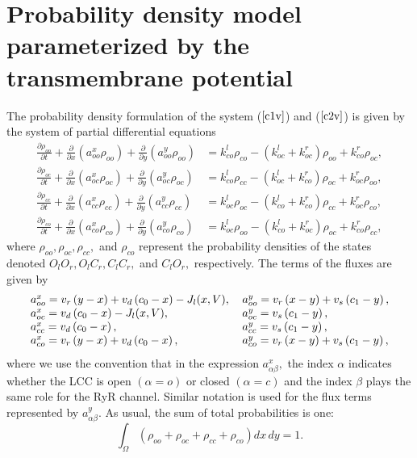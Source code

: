 \section[Probability density model parameterized by V]{Probability density model parameterized by the transmembrane potential}


The probability density formulation of the system ($\ref{c1v}$) and ($\ref{c2v}$) is given by the
 system of partial differential equations
\begin{align}
\frac{\partial\rho_{oo}}{\partial t}+\frac{\partial}{\partial x}\left(
a_{oo}^{x}\rho_{oo}\right)  +\frac{\partial}{\partial y}\left(  a_{oo}^{y}
\rho_{oo}\right)   &  =k_{co}^{l}\rho_{co}-\left(  k_{oc}^{l}+k_{oc}
^{r}\right)  \rho_{oo}+k_{co}^{r}\rho_{oc},\label{eq:pdfoo}\\
\frac{\partial\rho_{oc}}{\partial t}+\frac{\partial}{\partial x}\left(
a_{oc}^{x}\rho_{oc}\right)  +\frac{\partial}{\partial y}\left(  a_{oc}^{y}
\rho_{oc}\right)   &  =k_{co}^{l}\rho_{cc}-\left(  k_{oc}^{l}+k_{co}
^{r}\right)  \rho_{oc}+k_{oc}^{r}\rho_{oo},\label{eq:pdfoc}\\
\frac{\partial\rho_{cc}}{\partial t}+\frac{\partial}{\partial x}\left(
a_{cc}^{x}\rho_{cc}\right)  +\frac{\partial}{\partial y}\left(  a_{cc}^{y}
\rho_{cc}\right)   &  =k_{oc}^{l}\rho_{oc}-\left(  k_{co}^{l}+k_{co}
^{r}\right)  \rho_{cc}+k_{oc}^{r}\rho_{co},\label{eq:pdfcc}\\
\frac{\partial\rho_{co}}{\partial t}+\frac{\partial}{\partial x}\left(
a_{co}^{x}\rho_{co}\right)  +\frac{\partial}{\partial y}\left(  a_{co}^{y}
\rho_{co}\right)   &  =k_{oc}^{l}\rho_{oo}-\left(  k_{co}^{l}+k_{oc}
^{r}\right)  \rho_{oc}+k_{co}^{r}\rho_{cc},\label{eq:pdfco}
\end{align}
where $\rho_{oo},\rho_{oc},\rho_{cc},$ and $\rho_{co}$ represent the probability
densities of the states denoted
$O_{l}O_{r},O_{l}C_{r},C_{l}C_{r},$ and $C_{l}O_{r},$ respectively. The terms of the fluxes are given by
\[
\begin{tabular}
[c]{ll}
$a_{oo}^{x}=v_{r}\left(  y-x\right)  +v_{d}\left(  c_{0}-x\right)
-J_{l}(x,V),$ & $a_{oo}^{y}=v_{r}\left(  x-y\right)  +v_{s}\left(
c_{1}-y\right),  $\\
$a_{oc}^{x}=v_{d}\left(  c_{0}-x\right) - J_{l}(x,V),$ &
$a_{oc}^{y}=v_{s}\left(  c_{1}-y\right),  $\\
$a_{cc}^{x}=v_{d}\left(  c_{0}-x\right),  $ & $a_{cc}^{y}=v_{s}\left(
c_{1}-y\right),  $\\
$a_{co}^{x}=v_{r}\left(  y-x\right)+v_{d}\left(  c_{0}-x\right),  $ & $a_{co}^{y}
=v_{r}\left(  x-y\right)  +v_{s}\left(  c_{1}-y\right),  $
\end{tabular}
\]
where we use the convention that in the expression $a_{\alpha\beta}
^{x},$ the index $\alpha$ indicates whether the LCC is open
$(\alpha=o)$ or closed $(\alpha=c)$ and the index $\beta$ plays the same role
for the RyR channel. Similar notation is used for the flux terms represented by
$a_{\alpha\beta}^{y}.$ As usual, the sum of total probabilities is
one:
\begin{equation}
\int_{\Omega}\left(  \rho_{oo}+\rho_{oc}+\rho_{cc}+\rho_{co}\right)  dx\,dy=1. \label{sumone}
\end{equation}



